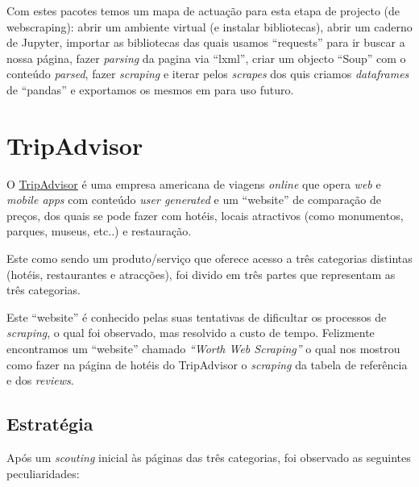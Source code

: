 \documentclass[a4paper,10pt]{article}
\begin{document}
Com estes pacotes temos um mapa de actuação para esta etapa de projecto (de webscraping): abrir um ambiente virtual (e instalar bibliotecas), abrir um caderno de Jupyter, importar as bibliotecas das quais usamos ``requests'' para ir buscar a nossa página, fazer \textit{parsing} da pagina via ``lxml'', criar um objecto ``Soup'' com o conteúdo \textit{parsed}, fazer \textit{scraping} e iterar pelos \textit{scrapes} dos quis criamos \textit{dataframes} de ``pandas'' e exportamos os mesmos em  para uso futuro.

\newpage

\section{TripAdvisor}

O \href{https://www.tripadvisor.pt/}{TripAdvisor} é uma empresa americana de viagens \textit{online} que opera \textit{web} e \textit{mobile apps} com conteúdo \textit{user generated} e um ``website'' de comparação de preços, dos quais se pode fazer com hotéis, locais atractivos (como monumentos, parques, museus, etc..) e restauração.

Este como sendo um produto/serviço que oferece acesso a três categorias distintas (hotéis, restaurantes e atracções), foi divido em três partes que representam as três categorias.

Este ``website'' é conhecido pelas suas tentativas de dificultar os processos de \textit{scraping}, o qual foi observado, mas resolvido a custo de tempo. Felizmente encontramos um ``website'' chamado \textit{``Worth Web Scraping''} o qual nos mostrou como fazer na página de hotéis do TripAdvisor o \textit{scraping} da tabela de referência\cite{wws1} e dos \textit{reviews}\cite{wws2}.

\subsection{Estratégia}

Após um \textit{scouting} inicial às páginas das três categorias, foi observado as seguintes peculiaridades:
\end{document}
